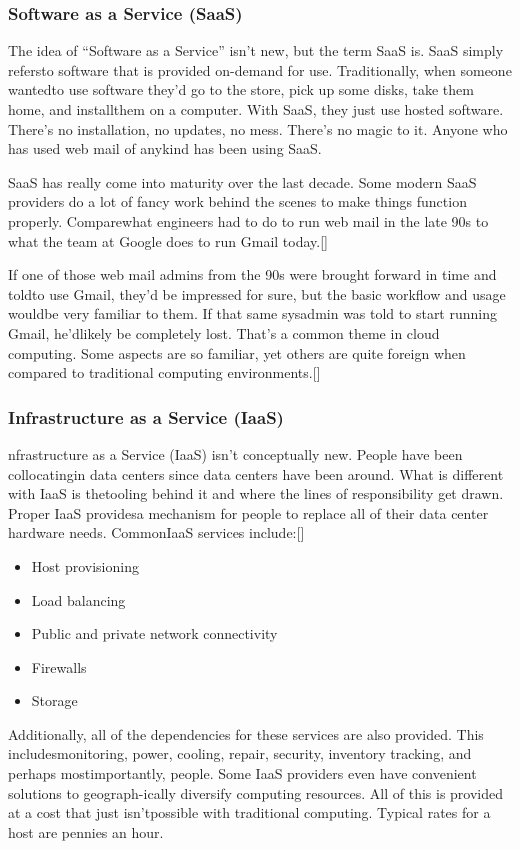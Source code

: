 \subsubsection*{Software as a Service (SaaS)}
The idea of “Software as a Service” isn’t new, but the term SaaS is. SaaS simply refersto software that is provided on-demand for use. Traditionally, when someone wantedto use software they’d go to the store, pick up some disks, take them home, and installthem on a computer. With SaaS, they just use hosted software. There’s no installation, no updates, no mess. There’s no magic to it. Anyone who has used web mail of anykind has been using SaaS.
\newline

SaaS has really come into maturity over the last decade. Some modern SaaS providers do a lot of fancy work behind the scenes to make things function properly. Comparewhat engineers had to do to run web mail in the late 90s to what the team at Google does to run Gmail today.[\cite{19}]
\newline

If one of those web mail admins from the 90s were brought forward in time and toldto use Gmail, they’d be impressed for sure, but the basic workflow and usage wouldbe very familiar to them. If that same sysadmin was told to start running Gmail, he’dlikely be completely lost. That’s a common theme in cloud computing. Some aspects are so familiar, yet others are quite foreign when compared to traditional computing environments.[\cite{19}]
\subsubsection*{Infrastructure as a Service (IaaS)}
nfrastructure as a Service (IaaS) isn’t conceptually new. People have been collocatingin data centers since data centers have been around. What is different with IaaS is thetooling behind it and where the lines of responsibility get drawn. Proper IaaS providesa mechanism for people to replace all of their data center hardware needs. CommonIaaS services include:[\cite{19}]
\begin{itemize}
	\item Host provisioning
	\item Load balancing
	\item Public and private network connectivity
	\item Firewalls
	\item Storage
\end{itemize}
Additionally, all of the dependencies for these services are also provided. This includesmonitoring, power, cooling, repair, security, inventory tracking, and perhaps mostimportantly, people. Some IaaS providers even have convenient solutions to geograph-ically diversify computing resources. All of this is provided at a cost that just isn’tpossible with traditional computing. Typical rates for a host are pennies an hour.
\newline

